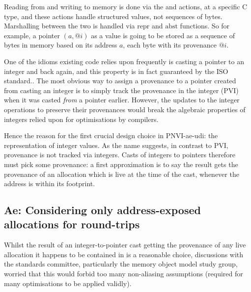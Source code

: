 Reading from and writing to memory is done via the  and
 actions, at a specific C type, and these actions handle
structured  values, not sequences of bytes. Marshalling between the
two is handled via $\mathrm{repr}$ and $\mathrm{abst}$ functions. So for
example, a pointer $(a, @i)$ as a value is going to be stored as a sequence of
bytes in memory based on its address $a$, each byte with its provenance
$@i$.

One of the idioms existing code relies upon frequently is casting a pointer to
an integer and back again, and this  property is in fact
guaranteed by the ISO standard.. The
most obvious way to assign a provenance to a pointer created from casting an
integer is to simply track the provenance in the integer (PVI) when it was
casted \emph{from} a pointer earlier. However, the updates to the integer
operations to preserve their provenances would break the algebraic properties
of integers relied upon for optimisations by compilers.

Hence the reason for the first crucial design choice in PNVI-ae-udi: the
representation of integer values. As the name suggests, in contrast to PVI,
provenance is not tracked via integers. Casts of integers to pointers therefore
must pick some provenance: a first approximation is to say the result gets the
provenance of an allocation which is live at the time of the cast, whenever the
address is within its footprint.

\subsection{Ae: Considering only address-exposed allocations for round-trips}

Whilst the result of an integer-to-pointer cast getting the provenance of any
live allocation it happens to be contained in is a reasonable choice,
discussions with the standards committee, particularly the memory object model
study group, worried that this would forbid too many non-aliasing assumptions
(required for many optimisations to be applied validly).

